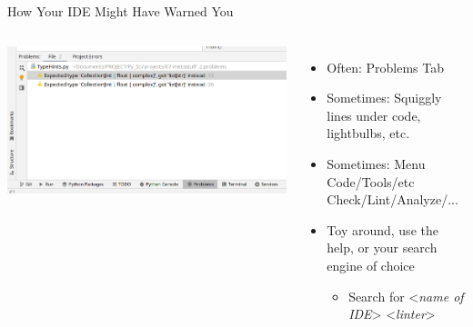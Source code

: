 
\begin{frame}{How Your IDE Might Have Warned You}
%
\begin{columns}[T]
	\includegraphics[width=\linewidth]{./gfx/09-pycharm-linter}
%
	\begin{itemize}
	\item Often: Problems Tab
	\item Sometimes: Squiggly lines under code, lightbulbs, etc.
	\item Sometimes: Menu \thus Code/Tools/etc \thus Check/Lint/Analyze/...
	\item Toy around, use the help, or your search engine of choice
		\begin{itemize}
		\item Search for <\emph{name of IDE}> <\emph{linter}>
		\end{itemize}
	\end{itemize}
\end{columns}
%
\end{frame}


